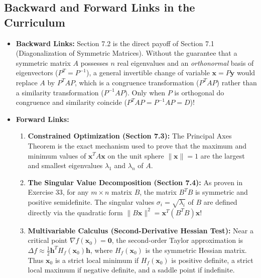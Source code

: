 \documentclass[11pt, letterpaper]{article}
\theoremstyle{definition}
\theoremstyle{remark}
\begin{document}
\subsection{Backward and Forward Links in the Curriculum}
\begin{itemize}
    \item \textbf{Backward Links:} Section 7.2 is the direct payoff of Section 7.1 (Diagonalization of Symmetric Matrices). Without the guarantee that a symmetric matrix $A$ possesses $n$ real eigenvalues and an \textit{orthonormal} basis of eigenvectors ($P^T = P^{-1}$), a general invertible change of variable $\mathbf{x} = P\mathbf{y}$ would replace $A$ by $P^T A P$, which is a congruence transformation ($P^T A P$) rather than a similarity transformation ($P^{-1} A P$). Only when $P$ is orthogonal do congruence and similarity coincide ($P^T A P = P^{-1} A P = D$)!
    \item \textbf{Forward Links:}
    \begin{enumerate}
        \item \textbf{Constrained Optimization (Section 7.3):} The Principal Axes Theorem is the exact mechanism used to prove that the maximum and minimum values of $\mathbf{x}^T A \mathbf{x}$ on the unit sphere $\|\mathbf{x}\| = 1$ are the largest and smallest eigenvalues $\lambda_1$ and $\lambda_n$ of $A$.
        \item \textbf{The Singular Value Decomposition (Section 7.4):} As proven in Exercise 33, for any $m \times n$ matrix $B$, the matrix $B^T B$ is symmetric and positive semidefinite. The singular values $\sigma_i = \sqrt{\lambda_i}$ of $B$ are defined directly via the quadratic form $\|B\mathbf{x}\|^2 = \mathbf{x}^T (B^T B) \mathbf{x}$!
        \item \textbf{Multivariable Calculus (Second-Derivative Hessian Test):} Near a critical point $\nabla f(\mathbf{x}_0) = \mathbf{0}$, the second-order Taylor approximation is $\Delta f \approx \frac{1}{2} \mathbf{h}^T H_f(\mathbf{x}_0) \mathbf{h}$, where $H_f(\mathbf{x}_0)$ is the symmetric Hessian matrix. Thus $\mathbf{x}_0$ is a strict local minimum if $H_f(\mathbf{x}_0)$ is positive definite, a strict local maximum if negative definite, and a saddle point if indefinite.
    \end{enumerate}
\end{itemize}

\newpage
\end{document}
